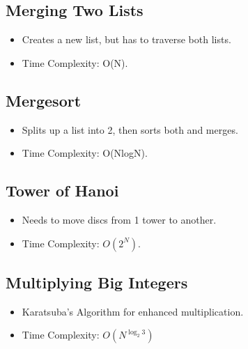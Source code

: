 \subsection{Merging Two Lists}
\begin{itemize}
    \item Creates a new list, but has to traverse both lists.
    \item Time Complexity: O(N).
\end{itemize}

\subsection{Mergesort}
\begin{itemize}
    \item Splits up a list into 2, then sorts both and merges.
    \item Time Complexity: O(NlogN).
\end{itemize}

\subsection{Tower of Hanoi}
\begin{itemize}
    \item Needs to move discs from 1 tower to another.
    \item Time Complexity: $O(2^N)$.
\end{itemize}

\subsection{Multiplying Big Integers}
\begin{itemize}
    \item Karatsuba's Algorithm for enhanced multiplication.
    \item Time Complexity: $O(N^{\log_2{3}})$
\end{itemize}